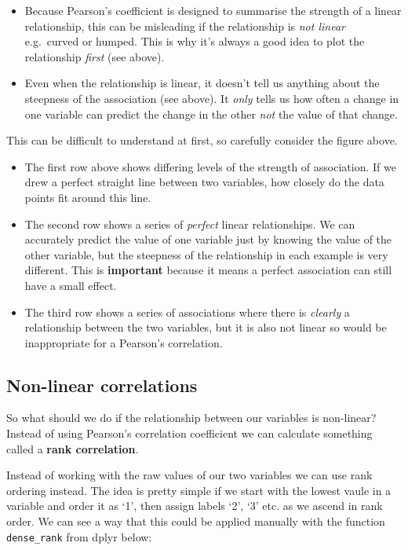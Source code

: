 \documentclass[
]{book}
\begin{document}
\begin{itemize}
\item
  Because Pearson's coefficient is designed to summarise the strength of a linear relationship, this can be misleading if the relationship is \emph{not linear} e.g.~curved or humped. This is why it's always a good idea to plot the relationship \emph{first} (see above).
\item
  Even when the relationship is linear, it doesn't tell us anything about the steepness of the association (see above). It \emph{only} tells us how often a change in one variable can predict the change in the other \emph{not} the value of that change.
\end{itemize}

This can be difficult to understand at first, so carefully consider the figure above.

\begin{itemize}
\item
  The first row above shows differing levels of the strength of association. If we drew a perfect straight line between two variables, how closely do the data points fit around this line.
\item
  The second row shows a series of \emph{perfect} linear relationships. We can accurately predict the value of one variable just by knowing the value of the other variable, but the steepness of the relationship in each example is very different. This is \textbf{important} because it means a perfect association can still have a small effect.
\item
  The third row shows a series of associations where there is \emph{clearly} a relationship between the two variables, but it is also not linear so would be inappropriate for a Pearson's correlation.
\end{itemize}

\hypertarget{non-linear-correlations}{%
\subsection{Non-linear correlations}\label{non-linear-correlations}}

So what should we do if the relationship between our variables is non-linear? Instead of using Pearson's correlation coefficient we can calculate something called a \textbf{rank correlation}.

Instead of working with the raw values of our two variables we can use rank ordering instead. The idea is pretty simple if we start with the lowest vaule in a variable and order it as `1', then assign labels `2', `3' etc. as we ascend in rank order. We can see a way that this could be applied manually with the function \texttt{dense\_rank} from dplyr below:
\end{document}
